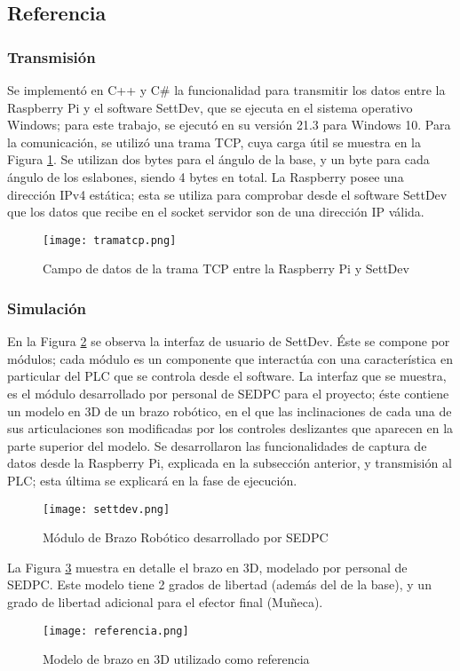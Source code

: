 \subsection{Referencia}

\subsubsection{Transmisión}

Se implementó en C++ y C\# la funcionalidad para transmitir los datos entre la Raspberry Pi y el software SettDev, que se ejecuta en el sistema operativo Windows; para este trabajo, se ejecutó en su versión 21.3 para Windows 10. Para la comunicación, se utilizó una trama TCP, cuya carga útil se muestra en la Figura \ref{fig:tramatcp}. Se utilizan dos bytes para el ángulo de la base, y un byte para cada ángulo de los eslabones, siendo 4 bytes en total. La Raspberry posee una dirección IPv4 estática; esta se utiliza para comprobar desde el software SettDev que los datos que recibe en el socket servidor son de una dirección IP válida.

\begin{figure}[htb]
	\centering
	\texttt{[image: tramatcp.png]}
	\caption{Campo de datos de la trama TCP entre la Raspberry Pi y SettDev}
	\label{fig:tramatcp}
\end{figure}

\subsubsection{Simulación}

En la Figura \ref{fig:settdev} se observa la interfaz de usuario de SettDev. Éste se compone por módulos; cada módulo es un componente que interactúa con una característica en particular del PLC que se controla desde el software. La interfaz que se muestra, es el módulo desarrollado por personal de SEDPC para el proyecto; éste contiene un modelo en 3D de un brazo robótico, en el que las inclinaciones de cada una de sus articulaciones son modificadas por los controles deslizantes que aparecen en la parte superior del modelo. Se desarrollaron las funcionalidades de captura de datos desde la Raspberry Pi, explicada en la subsección anterior, y transmisión al PLC; esta última se explicará en la fase de ejecución.

\begin{figure}[htb]
	\centering
	\texttt{[image: settdev.png]}
	\caption{Módulo de Brazo Robótico desarrollado por SEDPC}
	\label{fig:settdev}
\end{figure}

La Figura \ref{fig:referencia} muestra en detalle el brazo en 3D, modelado por personal de SEDPC. Este modelo tiene 2 grados de libertad (además del de la base), y un grado de libertad adicional para el efector final (Muñeca).

\begin{figure}[htb]
	\centering
	\texttt{[image: referencia.png]}
	\caption{Modelo de brazo en 3D utilizado como referencia}
	\label{fig:referencia}
\end{figure}